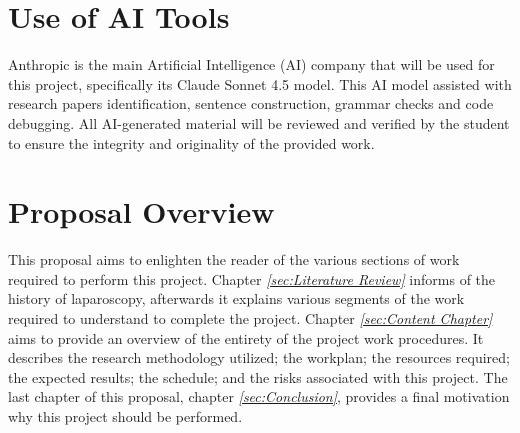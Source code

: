 \section{Use of AI Tools}

Anthropic is the main Artificial Intelligence (AI) company that will be used for this project, specifically its Claude Sonnet 4.5 model. This AI model assisted with research papers identification, sentence construction, grammar checks and code debugging. All AI-generated material will be reviewed and verified by the student to ensure the integrity and originality of the provided work. 

\section{Proposal Overview}

This proposal aims to enlighten the reader of the various sections of work required to perform this project. Chapter \textit{\ref{sec:Literature Review}}  informs of the history of laparoscopy, afterwards it explains various segments of the work required to understand to complete the project. Chapter \textit{\ref{sec:Content Chapter}} aims to provide an overview of the entirety of the project work procedures. It describes the research methodology utilized; the workplan; the resources required; the expected results; the schedule; and  the risks associated with this project. The last chapter of this proposal, chapter \textit{\ref{sec:Conclusion}}, provides a final motivation why this project should be performed.